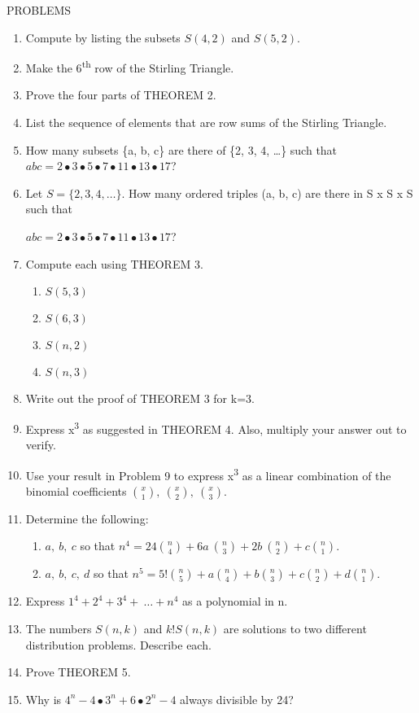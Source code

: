PROBLEMS
\begin{enumerate}
\def\labelenumi{\arabic{enumi}.}

\item
  Compute by listing the subsets \(S(4,2)\) and \(S(5,2)\).
\item
  Make the 6\textsuperscript{th} row of the Stirling Triangle.
\item
  Prove the four parts of THEOREM 2.
\item
  List the sequence of elements that are row sums of the Stirling
  Triangle.
\item
  How many subsets \{a, b, c\} are there of \{2, 3, 4, \ldots{}\} such
  that
  \(abc = 2 \bullet 3 \bullet 5 \bullet 7 \bullet 11 \bullet 13 \bullet 17\)?
\item
  Let \(S = \{ 2,3,4,\ldots\}\). How many ordered triples (a, b, c) are
  there in S x S x S such that

\(abc = 2 \bullet 3 \bullet 5 \bullet 7 \bullet 11 \bullet 13 \bullet 17\)?
\item
  Compute each using THEOREM 3.
\begin{enumerate}
  \def\labelenumii{\alph{enumii}.}

  \item
    \(S\left( 5,3 \right)\)
  \item
    \(S(6,3)\)
  \item
    \(S(n,2)\)
  \item
    \(S(n,3)\)

\end{enumerate}
\item
  Write out the proof of THEOREM 3 for k=3.
\item
  Express x\textsuperscript{3} as suggested in THEOREM 4. Also, multiply
  your answer out to verify.
\item
  Use your result in Problem 9 to express x\textsuperscript{3} as a
  linear combination of the binomial coefficients \(\binom{x}{1}
,\
\binom{x}{2}
,\
\binom{x}{3}
\).
\item
  Determine the following:
\begin{enumerate}
  \def\labelenumii{\alph{enumii}.}

  \item
    \(a,\ b,\ c\) so that \(n^{4} = 24
\binom{n}{4}
 + 6a\
\binom{n}{3}
 + 2b\
\binom{n}{2}
 + c
\binom{n}{1}
\).
  \item
    \(a,\ b,\ c,\ d\) so that \(n^{5} = 5!
\binom{n}{5}
 + a
\binom{n}{4}
 + b
\binom{n}{3}
 + c
\binom{n}{2}
 + d
\binom{n}{1}
\).

\end{enumerate}
\item
  Express \(1^{4} + 2^{4} + 3^{4} + \ \ldots + n^{4}\) as a polynomial
  in n.
\item
  The numbers \(S(n,k)\) and \(k!S(n,k)\) are solutions to two different
  distribution problems. Describe each.
\item
  Prove THEOREM 5.
\item
  Why is \(4^{n} - 4 \bullet 3^{n} + 6 \bullet 2^{n} - 4\) always
  divisible by 24?

\end{enumerate}

